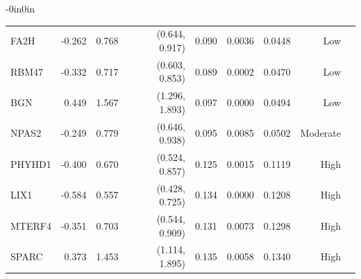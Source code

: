 \begin{table}[t]
\begin{adjustwidth}{-0in}{0in}
{\begin{tabular}{lrrrrrrrr}
  FA2H       & -0.262 & 0.768 & (0.644, 0.917) & 0.090 & 0.0036   & 0.0448  & Low \\
  RBM47      & -0.332 & 0.717 & (0.603, 0.853) & 0.089 & 0.0002   & 0.0470  & Low \\
  BGN        & 0.449  & 1.567 & (1.296, 1.893) & 0.097 & 0.0000   & 0.0494  & Low \\
  NPAS2      & -0.249 & 0.779 & (0.646, 0.938) & 0.095 & 0.0085   & 0.0502  & Moderate \\
  PHYHD1     & -0.400 & 0.670 & (0.524, 0.857) & 0.125 & 0.0015   & 0.1119  & High \\
  LIX1       & -0.584 & 0.557 & (0.428, 0.725) & 0.134 & 0.0000   & 0.1208  & High \\
  MTERF4     & -0.351 & 0.703 & (0.544, 0.909) & 0.131 & 0.0073   & 0.1298  & High \\
  SPARC      & 0.373  & 1.453 & (1.114, 1.895) & 0.135 & 0.0058   & 0.1340  & High \\
  \bottomrule
  \end{tabular}
  }
  \end{adjustwidth}
\end{table}




